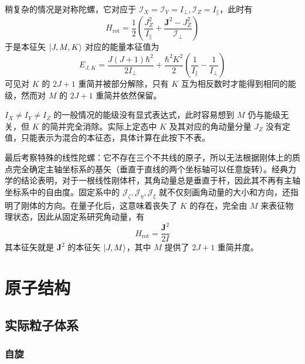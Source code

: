 \documentclass[cn,10pt,math=newtx,citestyle=gb7714-2015,bibstyle=gb7714-2015]{elegantbook}
\def\bm{\boldsymbol}
\def\mc{\mathcal}
\begin{document}
稍复杂的情况是对称陀螺，它对应于 $\mc I_X=\mc I_Y = I_\perp, \mc I_Z = I_\parallel$，此时有
\begin{equation}
    H_\text{rot} = \frac 1 2\left(\frac{J_Z^2}{I_\parallel}+\frac{\bm J^2-J_Z^2}{\mc I_\perp}\right)
\end{equation}
于是本征矢 $\ket{J,M,K}$ 对应的能量本征值为
\begin{equation}
    E_{J,K} = \frac{J(J+1)\hbar^2}{2I_\perp} +\frac{\hbar^2K^2}2\left(\frac 1{I_\parallel}-\frac 1{I_\perp}\right)
\end{equation}
可见对 $K$ 的 $2J+1$ 重简并被部分解除，只有 $K$ 互为相反数时才能得到相同的能级，然而对 $M$ 的 $2J+1$ 重简并依然保留。

$I_X\ne I_Y\ne I_Z$ 的一般情况的能级没有显式表达式，此时容易想到 $M$ 仍与能级无关，但 $K$ 的简并完全消除。实际上定态中 $K$ 及其对应的角动量分量 $J_Z$ 没有定值，只能表示为混合的本征态，具体计算在此按下不表。

最后考察特殊的线性陀螺：它不存在三个不共线的原子，所以无法根据刚体上的质点完全确定主轴坐标系的基矢（垂直于直线的两个坐标轴可以任意旋转）。经典力学的结论表明，对于一根线性刚体杆，其角动量总是垂直于杆，因此其不再有主轴坐标系中的自由度。固定系中的 $\mc J_\zeta,\mc J_\eta,\mc J_\xi$ 就不仅刻画角动量的大小和方向，还指明了刚体的方向。在量子化后，这意味着丧失了 $K$ 的存在，完全由 $M$ 来表征物理状态，因此从固定系研究角动量，有
\begin{equation}
    H_\text{rot} = \frac{\bm J^2}{2I}
\end{equation}
其本征矢就是 $\bm J^2$ 的本征矢 $\ket{J,M}$，其中 $M$ 提供了 $2J+1$ 重简并度。

\chapter{原子结构}

\section{实际粒子体系}

\subsection{自旋}
\end{document}
